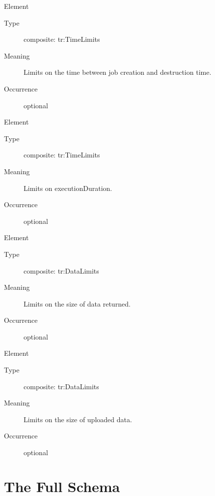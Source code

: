 \documentclass{ivoa}
\begin{document}
\begin{bigdescription}
\begin{description}
\end{description}
\item[Element \xmlel{retentionPeriod}]
\begin{description}
\item[Type\quad] composite: tr:TimeLimits
\item[Meaning\quad] 
              Limits on the time between job creation and
              destruction time.
              
\item[Occurrence\quad] optional

\end{description}
\item[Element \xmlel{executionDuration}]
\begin{description}
\item[Type\quad] composite: tr:TimeLimits
\item[Meaning\quad] 
              Limits on executionDuration.
              
\item[Occurrence\quad] optional

\end{description}
\item[Element \xmlel{outputLimit}]
\begin{description}
\item[Type\quad] composite: tr:DataLimits
\item[Meaning\quad] 
              Limits on the size of data returned.
              
\item[Occurrence\quad] optional

\end{description}
\item[Element \xmlel{uploadLimit}]
\begin{description}
\item[Type\quad] composite: tr:DataLimits
\item[Meaning\quad] 
              Limits on the size of uploaded data.
              
\item[Occurrence\quad] optional

\end{description}


\end{bigdescription}



\appendix


\section{The Full Schema}
\end{document}
